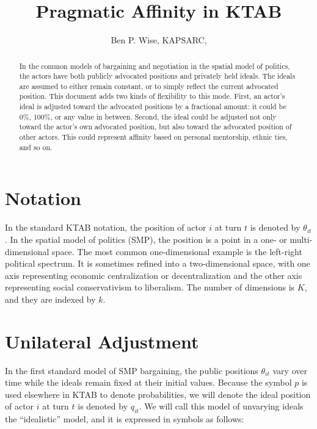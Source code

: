 \documentclass[a4paper,10pt]{article}
\title{Pragmatic Affinity in KTAB}
\author{Ben P. Wise, KAPSARC, \textbf{\color{red}{DRAFT v04}}}
\begin{document}
\maketitle
\thispagestyle{fancy}

\begin{abstract}


In the common models of bargaining and negotiation in the spatial model of politics, the actors have both
publicly advocated positions and privately held ideals.
The ideals are assumed to either remain constant, or to simply reflect the current advocated position.
This document adds two kinds of flexibility to this mode. First, an actor's  ideal is adjusted toward the
advocated positions by a fractional amount: it could be 0\%, 100\%, or any value in between.
Second, the ideal could be adjusted not only toward the actor's own advocated position, but also toward the 
advocated position of other actors. This could represent affinity based on personal mentorship, ethnic ties,
and so on.

\end{abstract}


\section{Notation}
In the standard KTAB notation, the position of actor $i$  at turn $t$ is denoted by $\theta_{it}$.
In the spatial model of politics (SMP), the position is a point in a one- or multi-dimensional space.
The most common one-dimensional example is the left-right political spectrum. It is sometimes refined
into a two-dimensional space, with one axis representing economic centralization or decentralization 
and the other
axis representing social conservativism to liberalism. 
The number of dimensions is $K$, and they are indexed by $k$.


\section{Unilateral Adjustment}

In the first standard model of SMP bargaining, the public positions $\theta_{it}$ vary over time
while the ideals remain fixed at their initial values. 
Because the symbol $p$ is used elsewhere in KTAB to denote probabilities, we will denote the ideal position of 
actor $i$  at turn $t$ is denoted by $q_{it}$.
We will call this model of unvarying ideals the ``idealistic'' model,
and it is expressed in symbols as follows:
\end{document}
